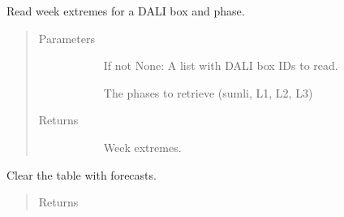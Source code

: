 \documentclass[letterpaper,10pt,english]{sphinxmanual}
\begin{document}
\begin{fulllineitems}
\label{\detokenize{autoapi/src/utils/snowflake/index:src.utils.snowflake.read_week_extremes}}
Read week extremes for a DALI box and phase.
\begin{quote}\begin{description}
\item[{Parameters}] \leavevmode\begin{description}
\item[{}] \leavevmode
If not None: A list with DALI box IDs to read.

\item[{}] \leavevmode
The phases to retrieve (sumli, L1, L2, L3)

\end{description}

\item[{Returns}] \leavevmode\begin{description}
\item[{}] \leavevmode
Week extremes.

\end{description}

\end{description}\end{quote}

\end{fulllineitems}


\begin{fulllineitems}
\label{\detokenize{autoapi/src/utils/snowflake/index:src.utils.snowflake.clear_forecasts}}
Clear the table with forecasts.
\begin{quote}\begin{description}
\item[{Returns}] \leavevmode\begin{description}
\item[{}] \leavevmode
\end{description}

\end{description}\end{quote}

\end{fulllineitems}
\end{document}
